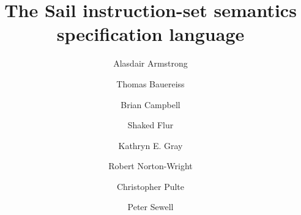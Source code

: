 \documentclass[a4paper]{article}
\begin{document}


\title{The Sail instruction-set semantics specification language}

\author{Alasdair Armstrong \and Thomas Bauereiss \and Brian Campbell \and
  Shaked Flur \and Kathryn E. Gray \and Robert Norton-Wright \and Christopher Pulte \and
  Peter Sewell}

\maketitle

\tableofcontents













\end{document}
